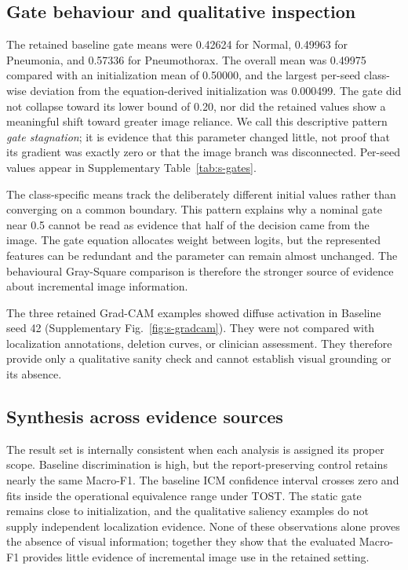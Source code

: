 \documentclass[10pt,a4paper,twocolumn]{article}
\begin{document}
\subsection{Gate behaviour and qualitative inspection}\label{sec:gates}

The retained baseline gate means were 0.42624 for Normal, 0.49963 for
Pneumonia, and 0.57336 for Pneumothorax. The overall mean was 0.49975 compared
with an initialization mean of 0.50000, and the largest per-seed class-wise
deviation from the equation-derived initialization was 0.000499. The gate did
not collapse toward its lower bound of 0.20, nor did the retained values show a
meaningful shift toward greater image reliance. We call this descriptive pattern
\emph{gate stagnation}; it is evidence that this parameter changed little, not
proof that its gradient was exactly zero or that the image branch was
disconnected. Per-seed values appear in Supplementary Table~\ref{tab:s-gates}.

The class-specific means track the deliberately different initial values rather
than converging on a common boundary. This pattern explains why a nominal gate
near 0.5 cannot be read as evidence that half of the decision came from the
image. The gate equation allocates weight between logits, but the represented
features can be redundant and the parameter can remain almost unchanged. The
behavioural Gray-Square comparison is therefore the stronger source of evidence
about incremental image information.

The three retained Grad-CAM examples showed diffuse activation in Baseline seed
42 (Supplementary Fig.~\ref{fig:s-gradcam}). They were not compared with
localization annotations, deletion curves, or clinician assessment. They
therefore provide only a qualitative sanity check and cannot establish visual
grounding or its absence.

\subsection{Synthesis across evidence sources}\label{sec:result-synthesis}

The result set is internally consistent when each analysis is assigned its
proper scope. Baseline discrimination is high, but the report-preserving
control retains nearly the same Macro-F1. The baseline ICM confidence interval
crosses zero and fits inside the operational equivalence range under TOST. The
static gate remains close to initialization, and the qualitative saliency
examples do not supply independent localization evidence. None of these
observations alone proves the absence of visual information; together they
show that the evaluated Macro-F1 provides little evidence of incremental image
use in the retained setting.
\end{document}
